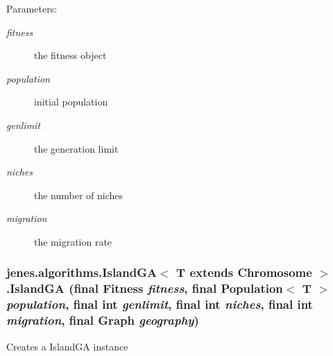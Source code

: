 \begin{Desc}
\item[Parameters:]
\begin{description}
\item[{\em fitness}]the fitness object \item[{\em population}]initial population \item[{\em genlimit}]the generation limit \item[{\em niches}]the number of niches \item[{\em migration}]the migration rate \end{description}
\end{Desc}
\hypertarget{classjenes_1_1algorithms_1_1_island_g_a_3_01_t_01extends_01_chromosome_01_4_36fa940b12f68377764049c7898fd8bd}{
\subsubsection[IslandGA]{\setlength{\rightskip}{0pt plus 5cm}jenes.algorithms.IslandGA$<$ T extends Chromosome $>$.IslandGA (final Fitness {\em fitness}, \/  final Population$<$ T $>$ {\em population}, \/  final int {\em genlimit}, \/  final int {\em niches}, \/  final int {\em migration}, \/  final Graph {\em geography})}}
\label{classjenes_1_1algorithms_1_1_island_g_a_3_01_t_01extends_01_chromosome_01_4_36fa940b12f68377764049c7898fd8bd}


Creates a IslandGA instance


